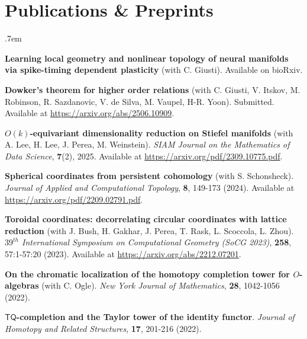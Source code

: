 \documentclass[10pt,letterpaper]{article}
\renewenvironment{itemize}{
  \begin{list}{}{
    \setlength{\leftmargin}{1.5em}
    \setlength{\itemsep}{0.25em}
    \setlength{\parskip}{0pt}
    \setlength{\parsep}{0.25em}
  }
}{
  \end{list}
}
\begin{document}
\section*{Publications \& Preprints}

\begin{itemize}\itemsep.7em

\item{\bf Learning local geometry and nonlinear topology of neural manifolds via spike-timing dependent plasticity} (with C. Giusti). Available on bioRxiv.

\item {\bf Dowker's theorem for higher order relations} (with C. Giusti, V. Itskov, M. Robinson, R. Sazdanovic, V. de Silva, M. Vaupel, H-R. Yoon). Submitted. Available at \url{https://arxiv.org/abs/2506.10909}.


\item{\bf $O(k)$-equivariant dimensionality reduction on Stiefel manifolds} (with A. Lee, H. Lee, J. Perea, M. Weinstein). \emph{SIAM Journal on the Mathematics of Data Science}, \textbf{7}(2), 2025. Available at \url{https://arxiv.org/pdf/2309.10775.pdf}.

\item {\bf Spherical coordinates from persistent cohomology} (with S. Schonsheck). \emph{Journal of Applied and Computational Topology}, \textbf{8}, 149-173 (2024). Available at \url{https://arxiv.org/pdf/2209.02791.pdf}.

\item{\bf Toroidal coordinates: decorrelating circular coordinates with lattice reduction} (with J. Bush, H. Gakhar, J. Perea, T. Rask, L. Scoccola, L. Zhou). \textit{$39^{th}$ International Symposium on Computational Geometry (SoCG 2023)}, \textbf{258},  57:1-57:20 (2023). Available at \url{https://arxiv.org/abs/2212.07201}.

\item{\bf On the chromatic localization of the homotopy completion tower for $O$-algebras} (with C. Ogle). \textit{New York Journal of Mathematics}, {\bf 28}, 1042-1056 (2022). 



\item{\bf $\mathsf{TQ}$-completion and the Taylor tower of the identity functor}. \textit{Journal of Homotopy and Related Structures}, \textbf{17}, 201-216 (2022). 


\end{itemize}
\end{document}
